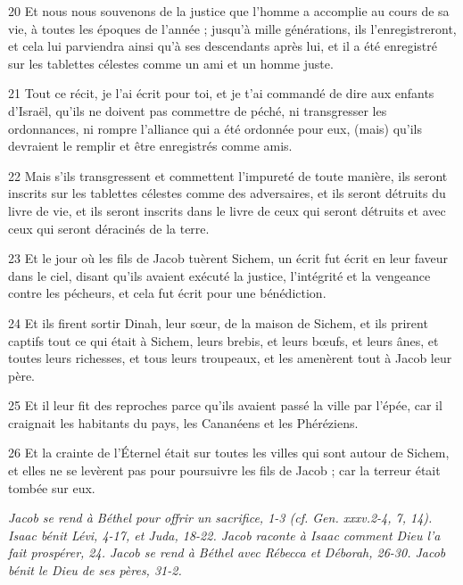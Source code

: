 \par 20 Et nous nous souvenons de la justice que l'homme a accomplie au cours de sa vie, à toutes les époques de l'année ; jusqu'à mille générations, ils l'enregistreront, et cela lui parviendra ainsi qu'à ses descendants après lui, et il a été enregistré sur les tablettes célestes comme un ami et un homme juste.
\par 21 Tout ce récit, je l'ai écrit pour toi, et je t'ai commandé de dire aux enfants d'Israël, qu'ils ne doivent pas commettre de péché, ni transgresser les ordonnances, ni rompre l'alliance qui a été ordonnée pour eux, (mais) qu'ils devraient le remplir et être enregistrés comme amis.
\par 22 Mais s'ils transgressent et commettent l'impureté de toute manière, ils seront inscrits sur les tablettes célestes comme des adversaires, et ils seront détruits du livre de vie, et ils seront inscrits dans le livre de ceux qui seront détruits et avec ceux qui seront déracinés de la terre.
\par 23 Et le jour où les fils de Jacob tuèrent Sichem, un écrit fut écrit en leur faveur dans le ciel, disant qu'ils avaient exécuté la justice, l'intégrité et la vengeance contre les pécheurs, et cela fut écrit pour une bénédiction.
\par 24 Et ils firent sortir Dinah, leur sœur, de la maison de Sichem, et ils prirent captifs tout ce qui était à Sichem, leurs brebis, et leurs bœufs, et leurs ânes, et toutes leurs richesses, et tous leurs troupeaux, et les amenèrent tout à Jacob leur père.
\par 25 Et il leur fit des reproches parce qu'ils avaient passé la ville par l'épée, car il craignait les habitants du pays, les Cananéens et les Phéréziens.
\par 26 Et la crainte de l'Éternel était sur toutes les villes qui sont autour de Sichem, et elles ne se levèrent pas pour poursuivre les fils de Jacob ; car la terreur était tombée sur eux.


\par \textit{Jacob se rend à Béthel pour offrir un sacrifice, 1-3 (cf. Gen. xxxv.2-4, 7, 14). Isaac bénit Lévi, 4-17, et Juda, 18-22. Jacob raconte à Isaac comment Dieu l'a fait prospérer, 24. Jacob se rend à Béthel avec Rébecca et Déborah, 26-30. Jacob bénit le Dieu de ses pères, 31-2.}

